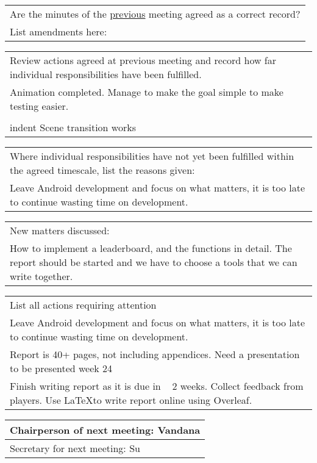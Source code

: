 \documentclass{article}
\begin{document}
\begin{table}[H]
	\centering
	\begin{tabular}{| p{12cm}  |}
	\hline
	Are the minutes of the \underline{previous} meeting agreed as a correct record? \\ 
	List amendments here: \\ \hline
\end{tabular}
\end{table}

\begin{table}[H]
	\centering
	\begin{tabular}{| p{12cm}  |}
	\hline
	Review actions agreed at previous meeting and record how far individual responsibilities have been fulfilled. \\ 
	Animation completed. 
	Manage to make the goal simple to make testing easier.\\
	\\
    indent Scene transition works \\ \hline
\end{tabular}
\end{table}

\begin{table}[H]
	\centering
	\begin{tabular}{| p{12cm}  |}
	\hline
	Where individual responsibilities have not yet been fulfilled within the agreed timescale, list the reasons given: \\
	Leave Android development and focus on what matters, it is too late to continue wasting time on development. \\ \hline
\end{tabular}
\end{table}

\begin{table}[H]
	\centering
	\begin{tabular}{| p{12cm}  |}
	\hline
	New matters discussed: \\ 
	How to implement a leaderboard, and the functions in detail.
	The report should be started and we have to choose a tools that we can write together.\\
\end{tabular}
\end{table}

\begin{table}[H]
	\centering
	\begin{tabular}{| p{12cm}  |}
	\hline
	List all actions requiring attention \\ 
	Leave Android development and focus on what matters, it is too late to continue wasting time on development.\\ 
	Report is 40+ pages, not including appendices. Need a presentation to be presented week 24 \\
	Finish writing report as it is due in ~ 2 weeks. Collect feedback from players. Use \LaTeX to write report online using Overleaf. \\ \hline
\end{tabular}
\end{table}

\begin{table}[H]
	\centering
	\begin{tabular}{| p{12cm}  |}
	\hline
	Chairperson of next meeting: Vandana\\ \hline
	Secretary for next meeting: Su \\ \hline
\end{tabular}
\end{table}
\end{document}
